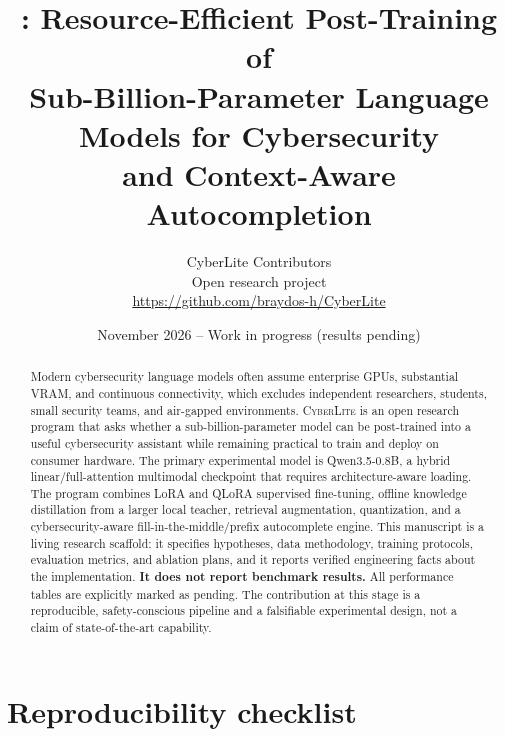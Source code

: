 \documentclass[11pt]{article}
\title{\bfseries \cyberlite: Resource-Efficient Post-Training of\\
Sub-Billion-Parameter Language Models for Cybersecurity\\
and Context-Aware Autocompletion}
\author{
  CyberLite Contributors\\
  \small Open research project\\
  \small \url{https://github.com/braydos-h/CyberLite}
}
\date{November 2026 \quad -- \quad Work in progress (results pending)}
\newcommand{\cyberlite}{\textsc{CyberLite}}
\begin{document}
\maketitle

\begin{abstract}
Modern cybersecurity language models often assume enterprise GPUs, substantial
VRAM, and continuous connectivity, which excludes independent researchers,
students, small security teams, and air-gapped environments. \cyberlite{} is an
open research program that asks whether a sub-billion-parameter model can be
post-trained into a useful cybersecurity assistant while remaining practical to
train and deploy on consumer hardware. The primary experimental model is
Qwen3.5-0.8B, a hybrid linear/full-attention multimodal checkpoint that requires
architecture-aware loading. The program combines LoRA and QLoRA supervised
fine-tuning, offline knowledge distillation from a larger local teacher,
retrieval augmentation, quantization, and a cybersecurity-aware
fill-in-the-middle/prefix autocomplete engine. This manuscript is a living
research scaffold: it specifies hypotheses, data methodology, training
protocols, evaluation metrics, and ablation plans, and it reports verified
engineering facts about the implementation. \textbf{It does not report
benchmark results.} All performance tables are explicitly marked as pending.
The contribution at this stage is a reproducible, safety-conscious pipeline and
a falsifiable experimental design, not a claim of state-of-the-art capability.
\end{abstract}




















\appendix
\section{Reproducibility checklist}

\end{document}
